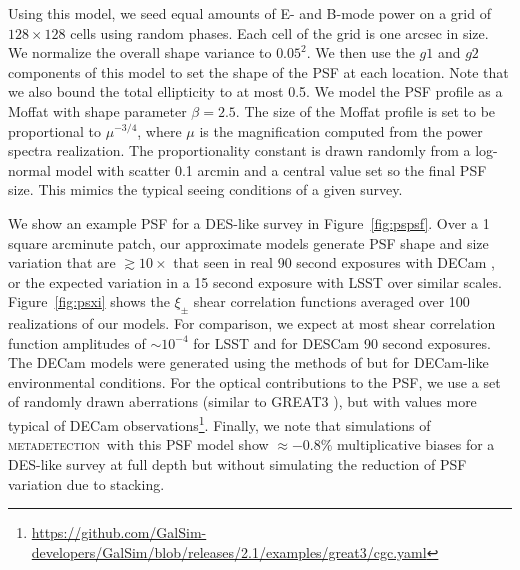 \documentclass[fleqn,useAMS,usenatbib]{mnras}
\newcommand{\mdet}{\textsc{metadetection}}
\begin{document}
Using this model, we seed equal amounts of E- and B-mode power on a grid of
$128\times128$ cells using random phases. Each cell of the grid is one
arcsec in size. We normalize the overall shape variance to $0.05^2$. We then use
the $g1$ and $g2$ components of this model to set the shape of the PSF at each
location. Note that we also bound the total ellipticity to at most 0.5.
We model the PSF profile as a Moffat with shape parameter $\beta=2.5$.
The size of the Moffat profile is set to be proportional to $\mu^{-3/4}$,
where $\mu$ is the magnification computed from the power spectra realization. The
proportionality constant is drawn randomly from a log-normal model with
scatter 0.1 arcmin and a central value set so the final PSF size. This mimics
the typical seeing conditions of a given survey.

We show an example PSF for a DES-like survey in Figure~\ref{fig:pspsf}.  Over a
1 square arcminute patch, our approximate models generate PSF shape and size
variation that are $\gtrsim10\times$ that seen in real 90 second exposures
with DECam \citep{DESY1shear}, or the expected variation in a 15 second exposure with
LSST \citep{jee2011} over similar scales. Figure~\ref{fig:psxi} shows the $\xi_{\pm}$ shear correlation
functions averaged over 100 realizations of our models. For comparison, we
expect at most shear correlation function amplitudes of $\sim10^{-4}$ for LSST
\citep{jee2011} and for DESCam 90 second exposures. The DECam models were generated
using the methods of \citep{jee2011} but for DECam-like environmental conditions. For
the optical contributions to the PSF, we use a set of randomly drawn
aberrations (similar to GREAT3 \citep{great3}), but with values more typical of
DECam
observations\footnote{\url{https://github.com/GalSim-developers/GalSim/blob/releases/2.1/examples/great3/cgc.yaml}}.
Finally, we note that simulations of \mdet\ with this PSF model show
$\approx-0.8\%$ multiplicative biases for a DES-like survey at full depth but
without simulating the reduction of PSF variation due to stacking.


\bsp
\label{lastpage}
\end{document}
